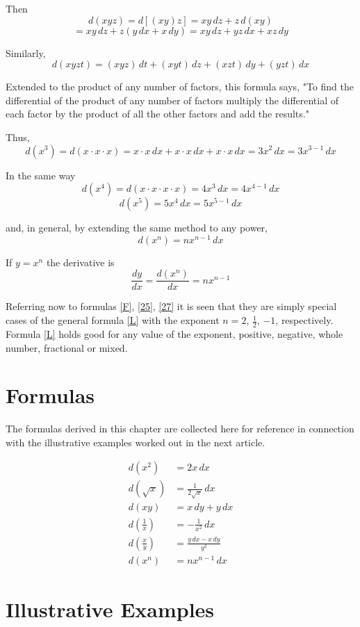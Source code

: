 Then
\[d(xyz) = d[(xy)z] = xy\,dz + z\,d(xy)\]
\[= xy\,dz + z(y\,dx + x\,dy) = xy\,dz + yz\,dx + xz\,dy\]

Similarly,
\[d(xyzt) = (xyz)\,dt + (xyt)\,dz + (xzt)\,dy + (yzt)\,dx\]

Extended to the product of any number of factors, this formula says, "To find the differential of the product of any number of factors multiply the differential of each factor by the product of all the other factors and add the results."

Thus,
\[d(x^3) = d(x\cdot x\cdot x) = x\cdot x\,dx + x\cdot x\,dx + x\cdot x\,dx = 3x^2\,dx = 3x^{3-1}\,dx\]

In the same way
\[d(x^4) = d(x\cdot x\cdot x\cdot x) = 4x^3\,dx = 4x^{4-1}\,dx\]
\[d(x^5) = 5x^4\,dx = 5x^{5-1}\,dx\]

and, in general, by extending the same method to any power,
\[d(x^n) = nx^{n-1}\,dx \tag{L} \label{L}\]

If $y = x^n$ the derivative is
\[\frac{dy}{dx} = \frac{d(x^n)}{dx} = nx^{n-1} \tag{28} \label{28}\]

Referring now to formulas \eqref{F}, \eqref{25}, \eqref{27} it is seen that they are simply special cases of the general formula \eqref{L} with the exponent $n = 2$, $\frac{1}{2}$, $-1$, respectively. Formula \eqref{L} holds good for any value of the exponent, positive, negative, whole number, fractional or mixed.

\section{Formulas}
The formulas derived in this chapter are collected here for reference in connection with the illustrative examples worked out in the next article.

\begin{align*}
d(x^2) &= 2x\,dx \tag{F} \label{F} \\[1em]
d(\sqrt{x}) &= \frac{1}{2\sqrt{x}}\,dx \tag{G} \label{G} \\[1em]
d(xy) &= x\,dy + y\,dx \tag{H} \label{H} \\[1em]
d(\frac{1}{x}) &= -\frac{1}{x^2}\,dx \tag{J} \label{J} \\[1em]
d(\frac{x}{y}) &= \frac{y\,dx - x\,dy}{y^2} \tag{K} \label{K} \\[1em]
d(x^n) &= nx^{n-1}\,dx \tag{L} \label{L}
\end{align*}

\section{Illustrative Examples}

